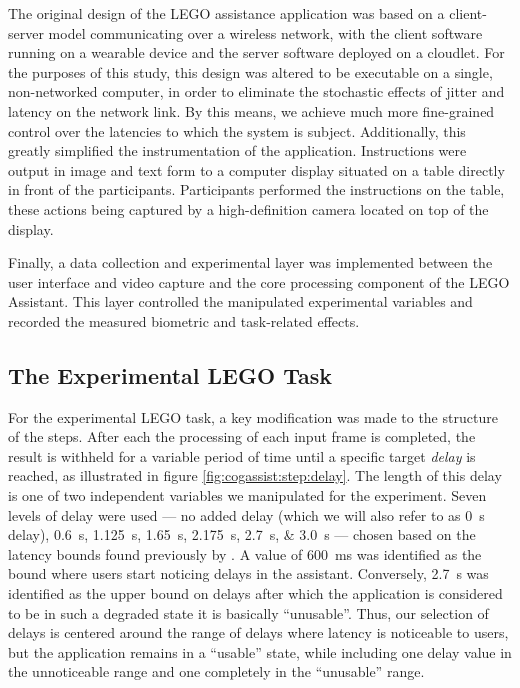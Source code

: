 \documentclass[10pt,letterpaper]{article}
\begin{document}
The original design of the LEGO assistance application was based on a client-server model communicating over a wireless network, with the client software running on a wearable device and the server software deployed on a cloudlet. 
For the purposes of this study, this design was altered to be executable on a single, non-networked computer, in order to eliminate the stochastic effects of jitter and latency on the network link.
By this means, we achieve much more fine-grained control over the latencies to which the system is subject.
Additionally, this greatly simplified the instrumentation of the application.
Instructions were output in image and text form to a computer display situated on a table directly in front of the participants.
Participants performed the instructions on the table, these actions being captured by a high-definition camera located on top of the display.

Finally, a data collection and experimental layer was implemented between the user interface and video capture and the core processing component of the LEGO Assistant.
This layer controlled the manipulated experimental variables and recorded the measured biometric and task-related effects.

\subsection{The Experimental LEGO Task}

For the experimental LEGO task, a key modification was made to the structure of the steps.
After each the processing of each input frame is completed, the result is withheld for a variable period of time until a specific target \emph{delay} is reached, as illustrated in figure \cref{fig:cogassist:step:delay}.
The length of this delay is one of two independent variables we manipulated for the experiment.
Seven levels of delay were used --- no added delay (which we will also refer to as \SI{0}{\second} delay), \SIlist{0.6;1.125;1.65;2.175;2.7;3.0}{\second} --- chosen based on the latency bounds found previously by \textcite{Chen:AnEmpiricalStudyOfLatency}.
A value of  \SI{600}{\milli\second} was identified as the bound where users start noticing delays in the assistant.
Conversely, \SI{2.7}{\second} was identified as the upper bound on delays after which the application is considered to be in such a degraded state it is basically ``unusable''.
Thus, our selection of delays is centered around the range of delays where latency is noticeable to users, but the application remains in a ``usable'' state, while including one delay value in the unnoticeable range and one completely in the ``unusable'' range.
\end{document}
